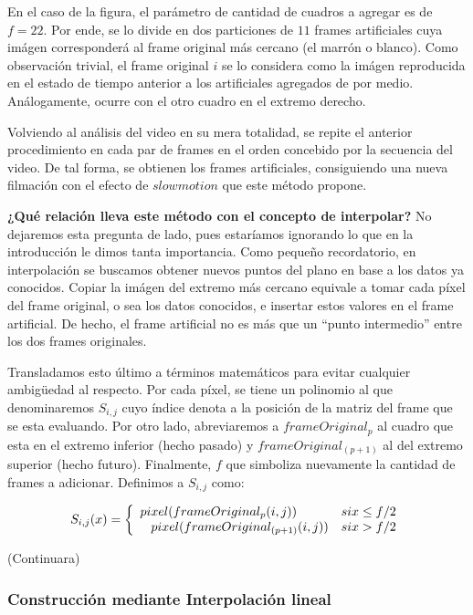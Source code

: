 En el caso de la figura, el par\'ametro de cantidad de cuadros a agregar es de $f = 22$. Por ende, se lo divide en dos particiones de $11$ frames artificiales cuya im\'agen corresponder\'a al frame original m\'as cercano (el marr\'on o blanco). Como observaci\'on trivial, el frame original $i$ se lo considera como la im\'agen reproducida en el estado de tiempo anterior a los artificiales agregados de por medio. An\'alogamente, ocurre con el otro cuadro en el extremo derecho.

Volviendo al an\'alisis del video en su mera totalidad, se repite el anterior procedimiento en cada par de frames en el orden concebido por la secuencia del video. De tal forma, se obtienen los frames artificiales, consiguiendo una nueva filmaci\'on con el efecto de $slowmotion$ que este m\'etodo propone. 

\textbf{¿Qu\'e relaci\'on lleva este m\'etodo con el concepto de interpolar?} No dejaremos esta pregunta de lado, pues estar\'iamos ignorando lo que en la introducci\'on le dimos tanta importancia. Como pequeño recordatorio, en interpolaci\'on se buscamos obtener nuevos puntos del plano en base a los datos ya conocidos. Copiar la im\'agen del extremo m\'as cercano equivale a tomar cada p\'ixel del frame original, o sea los datos conocidos, e insertar estos valores en el frame artificial. De hecho, el frame artificial no es m\'as que un ``punto intermedio'' entre los dos frames originales.

Transladamos esto \'ultimo a t\'erminos matem\'aticos para evitar cualquier ambigüedad al respecto. Por cada p\'ixel, se tiene un polinomio al que denominaremos $S_{i,j}$ cuyo \'indice denota a la posici\'on de la matriz del frame que se esta evaluando. Por otro lado, abreviaremos a $frameOriginal_{p}$ al cuadro que esta en el extremo inferior (hecho pasado) y $frameOriginal_{(p+1)}$ al del extremo superior (hecho futuro). Finalmente, $f$ que simboliza nuevamente la cantidad de frames a adicionar. Definimos a $S_{i,j}$ como:

\[
S_{i,j}(x) = 
\left\{
    \begin{array}{ll}
        pixel(frameOriginal_{p}(i,j)) & \mbox{si } x \leq f/2 \\
        \hspace{0.3cm}     
        pixel(frameOriginal_{(p+1)}(i,j)) & \mbox{si } x > f/2
    \end{array}
\right.
\]

(Continuara)

\subsubsection{Construcci\'on mediante Interpolaci\'on lineal}

